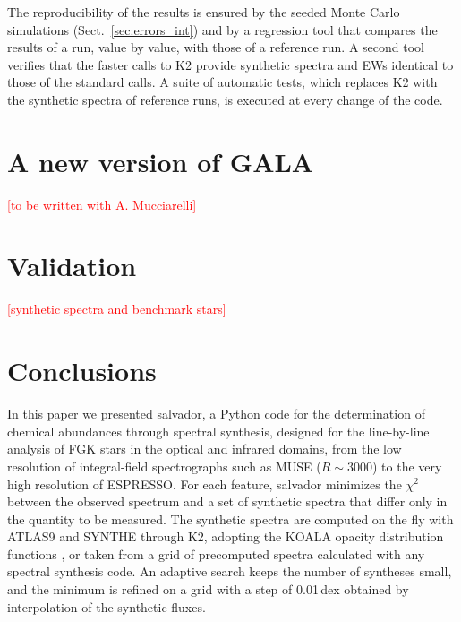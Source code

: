 \documentclass{aa}
\newcommand{\todo}[1]{\textcolor{red}{[#1]}}
\newcommand{\salvador}{salvador}   %
\begin{document}
The reproducibility of the results is ensured by the seeded Monte Carlo
simulations (Sect.~\ref{sec:errors_int}) and by a regression tool that
compares the results of a run, value by value, with those of a
reference run. A second tool verifies that the faster calls to K2
provide synthetic spectra and EWs identical to those of the standard
calls. A suite of automatic tests, which replaces K2 with the synthetic
spectra of reference runs, is executed at every change of the code.

\section{A new version of GALA}
\label{sec:gala}
\todo{to be written with A. Mucciarelli}

\section{Validation}
\label{sec:validation}
\todo{synthetic spectra and benchmark stars}

\section{Conclusions}
\label{sec:conclusions}

In this paper we presented \salvador{}, a Python code for the
determination of chemical abundances through spectral synthesis,
designed for the line-by-line analysis of FGK stars in the optical and
infrared domains, from the low resolution of integral-field
spectrographs such as MUSE ($R\sim3000$) to the very high resolution
of ESPRESSO. For each feature, \salvador{} minimizes the $\chi^2$
between the observed spectrum and a set of synthetic spectra that
differ only in the quantity to be measured. The synthetic spectra are
computed on the fly with ATLAS9 and SYNTHE through K2, adopting the
KOALA opacity distribution functions \citep{Mucciarelli2026}, or taken
from a grid of precomputed spectra calculated with any spectral
synthesis code. An adaptive search keeps the number of syntheses
small, and the minimum is refined on a grid with a step of 0.01\,dex
obtained by interpolation of the synthetic fluxes.
\end{document}
